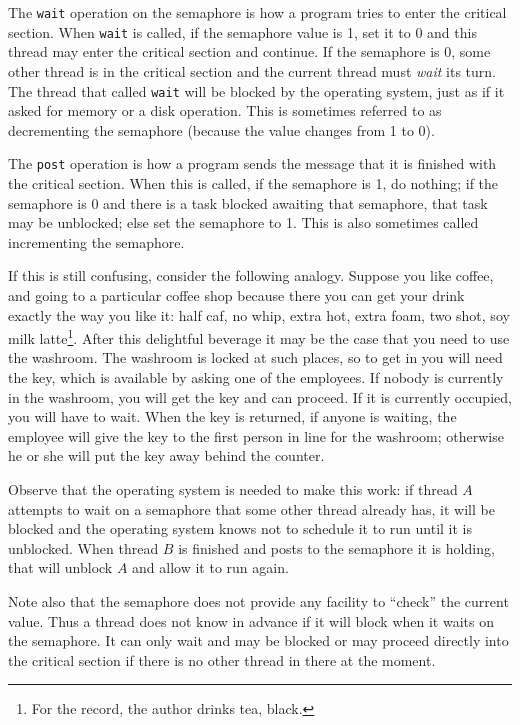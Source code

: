 \documentclass[a4paper]{report}
\begin{document}
\begin{appendices}
The \texttt{wait} operation on the semaphore is how a program tries to enter the critical section. When \texttt{wait} is called, if the semaphore value is 1, set it to 0 and this thread may enter the critical section and continue. If the semaphore is 0, some other thread is in the critical section and the current thread must \textit{wait} its turn. The thread that called \texttt{wait} will be blocked by the operating system, just as if it asked for memory or a disk operation. This is sometimes referred to as decrementing the semaphore (because the value changes from 1 to 0).

The \texttt{post} operation is how a program sends the message that it is finished with the critical section. When this is called, if the semaphore is 1, do nothing; if the semaphore is 0 and there is a task blocked awaiting that semaphore, that task may be unblocked; else set the semaphore to 1. This is also sometimes called incrementing the semaphore.

If this is still confusing, consider the following analogy. Suppose you like coffee, and going to a particular coffee shop because there you can get your drink exactly the way you like it: half caf, no whip, extra hot, extra foam, two shot, soy milk latte\footnote{For the record, the author drinks tea, black.}. After this delightful beverage it may be the case that you need to use the washroom. The washroom is locked at such places, so to get in you will need the key, which is available by asking one of the employees. If nobody is currently in the washroom, you will get the key and can proceed. If it is currently occupied, you will have to wait. When the key is returned, if anyone is waiting, the employee will give the key to the first person in line for the washroom; otherwise he or she will put the key away behind the counter.

Observe that the operating system is needed to make this work: if thread $A$ attempts to wait on a semaphore that some other thread already has, it will be blocked and the operating system knows not to schedule it to run until it is unblocked. When thread $B$ is finished and posts to the semaphore it is holding, that will unblock $A$ and allow it to run again.

Note also that the semaphore does not provide any facility to ``check'' the current value. Thus a thread does not know in advance if it will block when it waits on the semaphore. It can only wait and may be blocked or may proceed directly into the critical section if there is no other thread in there at the moment.


\end{appendices}
\end{document}

